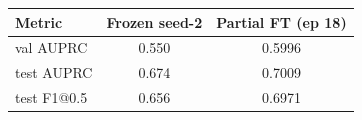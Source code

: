 \begin{tabular}{lcc}
\toprule
Metric & Frozen seed-2 & Partial FT (ep 18) \\
\midrule
val AUPRC & 0.550 & 0.5996 \\
test AUPRC & 0.674 & 0.7009 \\
test F1@0.5 & 0.656 & 0.6971 \\
\bottomrule
\end{tabular}

